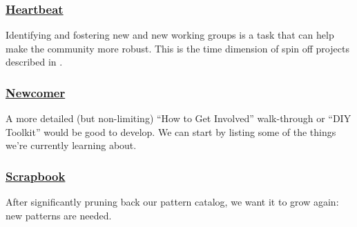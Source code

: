 \subsubsection*{\hyperref[sec:Heartbeat]{Heartbeat}} Identifying and fostering new  and new working groups is a task that can help make the community more robust.  This is the time dimension of spin off projects described in .

\subsubsection*{\hyperref[sec:Newcomer]{Newcomer}} A more detailed (but non-limiting) ``How to Get Involved'' walk-through or ``DIY Toolkit'' would be good to develop. We can start by listing some of the things we're currently learning about.

\subsubsection*{\hyperref[sec:Scrapbook]{Scrapbook}} 
After significantly pruning back our pattern catalog, we want it to grow again: new patterns are needed.




